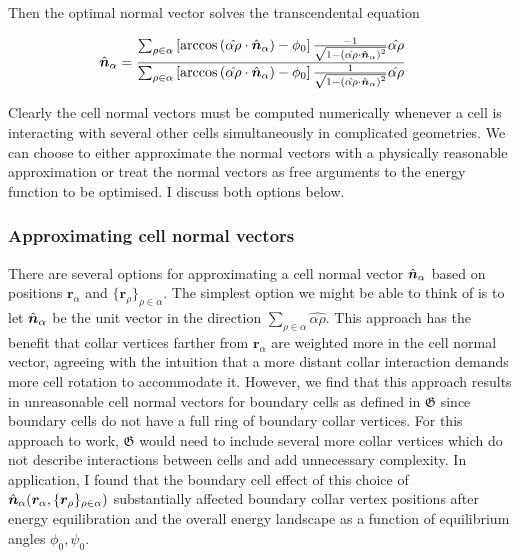 \noindent Then the optimal normal vector solves the transcendental equation 

\begin{align}
    \hat{\bm{n}}_\alpha &= \frac{\sum_{\rho\in\alpha} \left[ \arccos\left(\hat{\alpha\rho} \cdot \hat{\bm{n}}_\alpha \right) - \phi_0 \right] \frac{-1}{\sqrt{1 - \left(\hat{\alpha\rho} \cdot \hat{\bm{n}}_\alpha \right)^2 }} \hat{\alpha\rho} }{\sum_{\rho\in\alpha} \left[ \arccos\left(\hat{\alpha\rho} \cdot \hat{\bm{n}}_\alpha \right) - \phi_0 \right] \frac{1}{\sqrt{1 - \left(\hat{\alpha\rho} \cdot \hat{\bm{n}}_\alpha \right)^2 }} \hat{\alpha\rho}} \label{eq:optimal_n}
\end{align}

Clearly the cell normal vectors must be computed numerically whenever a cell is interacting with several other cells simultaneously in complicated geometries. 
We can choose to either approximate the normal vectors with a physically reasonable approximation or treat the normal vectors as free arguments to the energy function to be optimised.
I discuss both options below. 

\subsubsection{Approximating cell normal vectors}

There are several options for approximating a cell normal vector $\hat{\bm{n}}_\alpha$ based on positions $\bm{r}_\alpha$ and $\{ \bm{r}_\rho\}_{\rho\in\alpha}$. The simplest option we might be able to think of is to let $\hat{\bm{n}}_\alpha$ be the unit vector in the direction $\sum_{\rho\in\alpha}\hat{\alpha\rho}$. 
This approach has the benefit that collar vertices farther from $\bm{r}_\alpha$ are weighted more in the cell normal vector, agreeing with the intuition that a more distant collar interaction demands more cell rotation to accommodate it. 
However, we find that this approach results in unreasonable cell normal vectors for boundary cells as defined in $\mathfrak{G}$ since boundary cells do not have a full ring of boundary collar vertices. 
For this approach to work, $\mathfrak{G}$ would need to include several more collar vertices which do not describe interactions between cells and add unnecessary complexity.
In application, I found that the boundary cell effect of this choice of $\hat{\bm{n}}_\alpha(\bm{r}_\alpha, \{\bm{r}_\rho\}_{\rho\in\alpha})$ substantially affected boundary collar vertex positions after energy equilibration and the overall energy landscape as a function of equilibrium angles $\phi_0, \psi_0$. 

